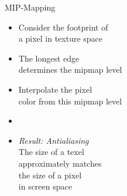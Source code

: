 \documentclass[utf8,stillsansserifmath,fleqn,t]{beamer}
\begin{document}
\begin{frame}
MIP-Mapping
\begin{itemize}
\item Consider the footprint of\\ a pixel in texture space
\item The longest edge\\ determines the mipmap level
\item Interpolate the pixel\\ color from this mipmap level
\item[~]
\item<5> \emph{Result: Antialiasing}\\
    The size of a texel\\ approximately matches\\ the size of a pixel\\ in screen space
\end{itemize}
\end{frame}
\end{document}

